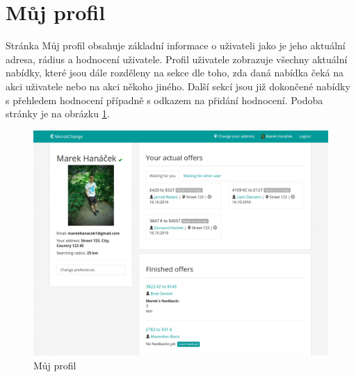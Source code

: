 \section{Můj profil}
\label{nur:my-profile}

Stránka Můj profil obsahuje základní informace o uživateli jako je jeho aktuální adresa, rádius a hodnocení uživatele.
Profil uživatele zobrazuje všechny aktuální nabídky, které jsou dále rozděleny na sekce dle toho, zda daná nabídka čeká na akci uživatele nebo na akci někoho jiného. Další sekcí jsou již dokončené nabídky s přehledem hodnocení případně s odkazem na přidání hodnocení. Podoba stránky je na obrázku \ref{fig:tur:my-profile}.

\begin{figure}[h]
    \centering
    \includegraphics[width=1.0\textwidth]{media/tur/my-profile.png}
    \caption{Můj profil}
    \label{fig:tur:my-profile}
\end{figure}
